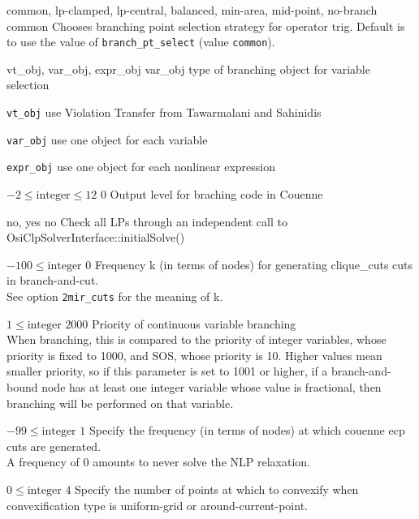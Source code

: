 %
{\ttfamily common, lp-clamped, lp-central, balanced, min-area, mid-point, no-branch}%
{common}%
{Chooses branching point selection strategy for operator trig.
Default is to use the value of \texttt{branch\_pt\_select} (value \texttt{common}).}%
{}

%
{\ttfamily vt\_obj, var\_obj, expr\_obj}%
{var\_obj}%
{type of branching object for variable selection}%
{\begin{list}{}{
\setlength{\parsep}{0em}
\setlength{\leftmargin}{5ex}
\setlength{\labelwidth}{2ex}
\setlength{\itemindent}{0ex}
\setlength{\topsep}{0pt}}
\item[\texttt{vt\_obj}] use Violation Transfer from Tawarmalani and Sahinidis
\item[\texttt{var\_obj}] use one object for each variable
\item[\texttt{expr\_obj}] use one object for each nonlinear expression
\end{list}
}

%
{$-2\leq\textrm{integer}\leq12$}%
{$0$}%
{Output level for braching code in Couenne}%
{}

%
{\ttfamily no, yes}%
{no}%
{Check all LPs through an independent call to OsiClpSolverInterface::initialSolve()}%
{}

%
{$-100\leq\textrm{integer}$}%
{$0$}%
{Frequency k (in terms of nodes) for generating clique\_cuts cuts in branch-and-cut.\\
See option \texttt{2mir\_cuts} for the meaning of k.}%
{}

%
{$1\leq\textrm{integer}$}%
{$2000$}%
{Priority of continuous variable branching\\
When branching, this is compared to the priority of integer variables, whose priority is fixed to 1000, and SOS, whose priority is 10. Higher values mean smaller priority, so if this parameter is set to 1001 or higher, if a branch-and-bound node has at least one integer variable whose value is fractional, then branching will be performed on that variable.}%
{}

%
{$-99\leq\textrm{integer}$}%
{$1$}%
{Specify the frequency (in terms of nodes) at which couenne ecp cuts are generated.\\
A frequency of 0 amounts to never solve the NLP relaxation.}%
{}

%
{$0\leq\textrm{integer}$}%
{$4$}%
{Specify the number of points at which to convexify when convexification type is uniform-grid or around-current-point.}%
{}

